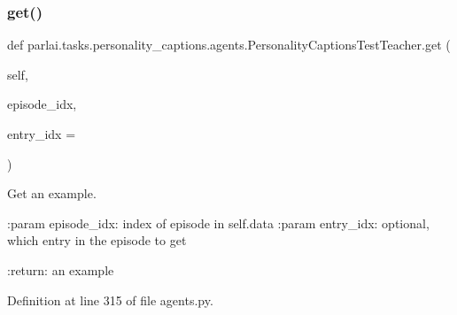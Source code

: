 \subsubsection{\texorpdfstring{get()}{get()}}
{\footnotesize\ttfamily def parlai.\+tasks.\+personality\+\_\+captions.\+agents.\+Personality\+Captions\+Test\+Teacher.\+get (\begin{DoxyParamCaption}\item[{}]{self,  }\item[{}]{episode\+\_\+idx,  }\item[{}]{entry\+\_\+idx = {} }\end{DoxyParamCaption})}

\begin{DoxyVerb}Get an example.

:param episode_idx:
    index of episode in self.data
:param entry_idx:
    optional, which entry in the episode to get

:return:
    an example
\end{DoxyVerb}
 

Definition at line 315 of file agents.\+py.



